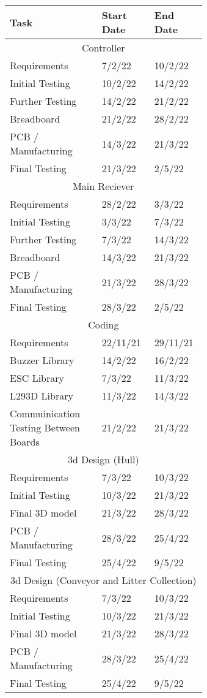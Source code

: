 \documentclass [12pt]{article}
\begin{document}
\begin{table}[H]
\centering
\begin{tabular}{||p{0.4\linewidth}|p{0.12\linewidth}|p{0.12\linewidth}||}
\hline
Task & Start Date & End Date \\
\hline
\multicolumn{3}{||c||}{Controller}\\
\hline
Requirements & 7/2/22 & 10/2/22 \\
\hline
Initial Testing & 10/2/22 & 14/2/22 \\
\hline	
Further Testing & 14/2/22 & 21/2/22 \\
\hline
Breadboard & 21/2/22 &	28/2/22 \\
\hline
PCB / Manufacturing & 14/3/22 &	21/3/22 \\
\hline
Final Testing & 21/3/22 & 2/5/22 \\
\hline
\multicolumn{3}{||c||}{Main Reciever}\\
\hline
Requirements & 28/2/22 & 3/3/22 \\
\hline
Initial Testing & 3/3/22 & 7/3/22 \\	
\hline
Further Testing & 7/3/22 & 14/3/22 \\	
\hline
Breadboard & 14/3/22 &	21/3/22 \\
\hline
PCB / Manufacturing & 21/3/22 &	28/3/22 \\
\hline
Final Testing & 28/3/22 & 2/5/22 \\
\hline	
\multicolumn{3}{||c||}{Coding}\\
\hline
Requirements & 22/11/21 & 29/11/21 \\
\hline
Buzzer Library & 14/2/22 & 16/2/22 \\
\hline
ESC Library & 7/3/22 & 11/3/22 \\
\hline
L293D Library & 11/3/22 & 14/3/22 \\ 
\hline
Commuinication Testing Between Boards & 21/2/22 & 21/3/22 \\
\hline
\multicolumn{3}{||c||}{3d Design (Hull)}\\
\hline
Requirements & 7/3/22 & 10/3/22 \\
\hline
Initial Testing & 10/3/22 & 21/3/22 \\
\hline
Final 3D model & 21/3/22 & 28/3/22 \\
\hline
PCB / Manufacturing & 28/3/22 & 25/4/22 \\
\hline
Final Testing & 25/4/22 & 9/5/22 \\
\hline
\multicolumn{3}{||c||}{3d Design (Conveyor and Litter Collection)}\\
\hline
Requirements & 7/3/22 & 10/3/22 \\
\hline
Initial Testing & 10/3/22 & 21/3/22 \\
\hline
Final 3D model & 21/3/22 & 28/3/22 \\
\hline
PCB / Manufacturing & 28/3/22 & 25/4/22 \\
\hline
Final Testing & 25/4/22 & 9/5/22 \\
\hline
\end{tabular}
\end{table}
\end{document}
